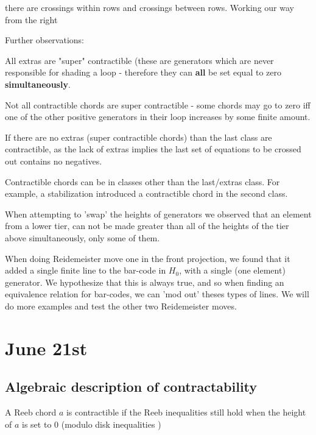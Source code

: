 \documentclass[11pt,oneside]{amsart}
\begin{document}
there are crossings within rows and crossings between rows. Working our way from the right






Further observations:

All extras are "super" contractible (these are generators which are never responsible for shading a loop - therefore they can \textbf{all} be set equal to zero \textbf{simultaneously}.

Not all contractible chords are super contractible - some chords may go to zero iff one of the other positive generators in their loop increases by some finite amount. 


If there are no extras (super contractible chords) than the last class are contractible, as the lack of extras implies the last set of equations to be crossed out contains no negatives. 


Contractible chords can be in classes other than the last/extras class. For example, a stabilization introduced a contractible chord in the second class.

When attempting to 'swap' the heights of generators we observed that an element from a lower tier, can not be made greater than all of the heights of the tier above simultaneously, only some of them.

When doing Reidemeister move one in the front projection, we found that it added a single finite line to the bar-code in $H_0$, with a single (one element) generator. We hypothesize that this is always true, and so when finding an equivalence relation for bar-codes, we can 'mod out' theses types of lines. We will do more examples and test the other two Reidemeister moves.








\section{June 21st}


\subsection{Algebraic description of contractability}

\begin{definition}[Contractible]
    A Reeb chord $a$ is contractible if the Reeb inequalities still hold when the height of $a$ is set to $0$ (modulo disk inequalities \TODO)
\end{definition}
\end{document}
